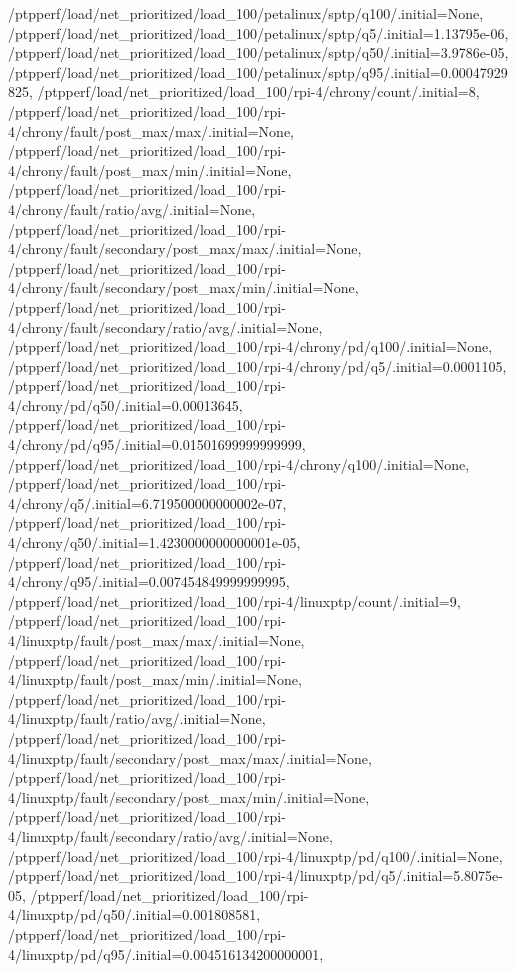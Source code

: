 {    /ptpperf/load/net_prioritized/load_100/petalinux/sptp/q100/.initial=None,
    /ptpperf/load/net_prioritized/load_100/petalinux/sptp/q5/.initial=1.13795e-06,
    /ptpperf/load/net_prioritized/load_100/petalinux/sptp/q50/.initial=3.9786e-05,
    /ptpperf/load/net_prioritized/load_100/petalinux/sptp/q95/.initial=0.00047929825,
    /ptpperf/load/net_prioritized/load_100/rpi-4/chrony/count/.initial=8,
    /ptpperf/load/net_prioritized/load_100/rpi-4/chrony/fault/post_max/max/.initial=None,
    /ptpperf/load/net_prioritized/load_100/rpi-4/chrony/fault/post_max/min/.initial=None,
    /ptpperf/load/net_prioritized/load_100/rpi-4/chrony/fault/ratio/avg/.initial=None,
    /ptpperf/load/net_prioritized/load_100/rpi-4/chrony/fault/secondary/post_max/max/.initial=None,
    /ptpperf/load/net_prioritized/load_100/rpi-4/chrony/fault/secondary/post_max/min/.initial=None,
    /ptpperf/load/net_prioritized/load_100/rpi-4/chrony/fault/secondary/ratio/avg/.initial=None,
    /ptpperf/load/net_prioritized/load_100/rpi-4/chrony/pd/q100/.initial=None,
    /ptpperf/load/net_prioritized/load_100/rpi-4/chrony/pd/q5/.initial=0.0001105,
    /ptpperf/load/net_prioritized/load_100/rpi-4/chrony/pd/q50/.initial=0.00013645,
    /ptpperf/load/net_prioritized/load_100/rpi-4/chrony/pd/q95/.initial=0.01501699999999999,
    /ptpperf/load/net_prioritized/load_100/rpi-4/chrony/q100/.initial=None,
    /ptpperf/load/net_prioritized/load_100/rpi-4/chrony/q5/.initial=6.719500000000002e-07,
    /ptpperf/load/net_prioritized/load_100/rpi-4/chrony/q50/.initial=1.4230000000000001e-05,
    /ptpperf/load/net_prioritized/load_100/rpi-4/chrony/q95/.initial=0.007454849999999995,
    /ptpperf/load/net_prioritized/load_100/rpi-4/linuxptp/count/.initial=9,
    /ptpperf/load/net_prioritized/load_100/rpi-4/linuxptp/fault/post_max/max/.initial=None,
    /ptpperf/load/net_prioritized/load_100/rpi-4/linuxptp/fault/post_max/min/.initial=None,
    /ptpperf/load/net_prioritized/load_100/rpi-4/linuxptp/fault/ratio/avg/.initial=None,
    /ptpperf/load/net_prioritized/load_100/rpi-4/linuxptp/fault/secondary/post_max/max/.initial=None,
    /ptpperf/load/net_prioritized/load_100/rpi-4/linuxptp/fault/secondary/post_max/min/.initial=None,
    /ptpperf/load/net_prioritized/load_100/rpi-4/linuxptp/fault/secondary/ratio/avg/.initial=None,
    /ptpperf/load/net_prioritized/load_100/rpi-4/linuxptp/pd/q100/.initial=None,
    /ptpperf/load/net_prioritized/load_100/rpi-4/linuxptp/pd/q5/.initial=5.8075e-05,
    /ptpperf/load/net_prioritized/load_100/rpi-4/linuxptp/pd/q50/.initial=0.001808581,
    /ptpperf/load/net_prioritized/load_100/rpi-4/linuxptp/pd/q95/.initial=0.004516134200000001,
}
